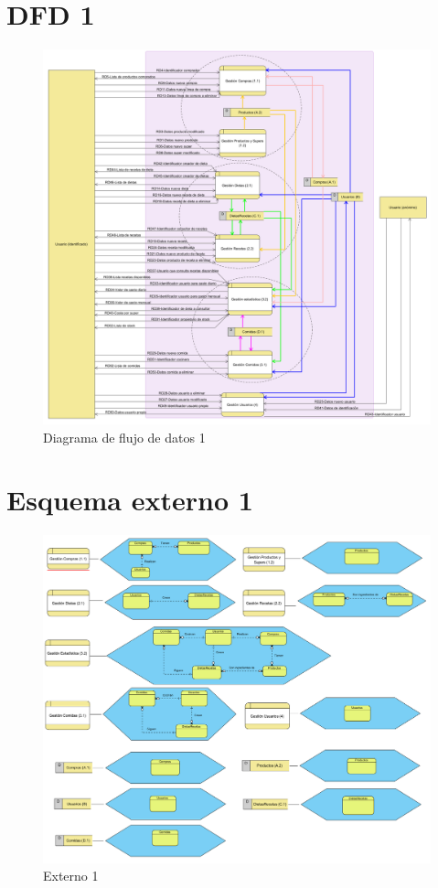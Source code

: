\documentclass[a4paper,12pt]{report}
\begin{document}
\section{DFD 1}
\label{sec-5-1}
\begin{figure}[!htp]
\centering
\includegraphics[width=0.9\linewidth]{./refinamientos/dfd1.png}
\caption{Diagrama de flujo de datos 1}
\label{fig:Diagrama de flujo de datos 1}
\medskip
\footnotesize
{}
\end{figure}
\section{Esquema externo 1}
\label{sec-5-2}
\begin{figure}[!htp]
\centering
\includegraphics[width=0.9\linewidth]{./refinamientos/externo1.png}
\caption{Externo 1}
\label{fig:Externo 1}
\medskip
\footnotesize
{}
\end{figure}
\end{document}
